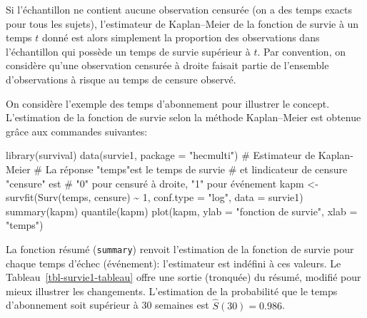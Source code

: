 \documentclass[
  11pt,
  letterpaper,
]{scrbook}
\newenvironment{Shaded}{\begin{snugshade}}{\end{snugshade}}
\newcommand{\AttributeTok}[1]{\textcolor[rgb]{0.40,0.45,0.13}{#1}}
\newcommand{\CommentTok}[1]{\textcolor[rgb]{0.37,0.37,0.37}{#1}}
\newcommand{\DecValTok}[1]{\textcolor[rgb]{0.68,0.00,0.00}{#1}}
\newcommand{\FunctionTok}[1]{\textcolor[rgb]{0.28,0.35,0.67}{#1}}
\newcommand{\NormalTok}[1]{\textcolor[rgb]{0.00,0.23,0.31}{#1}}
\newcommand{\OtherTok}[1]{\textcolor[rgb]{0.00,0.23,0.31}{#1}}
\newcommand{\SpecialCharTok}[1]{\textcolor[rgb]{0.37,0.37,0.37}{#1}}
\newcommand{\StringTok}[1]{\textcolor[rgb]{0.13,0.47,0.30}{#1}}
\theoremstyle{definition}
\theoremstyle{remark}
\begin{document}
Si l'échantillon ne contient aucune observation censurée (on a des temps
exacts pour tous les sujets), l'estimateur de Kaplan--Meier de la
fonction de survie à un temps \(t\) donné est alors simplement la
proportion des observations dans l'échantillon qui possède un temps de
survie supérieur à \(t\). Par convention, on considère qu'une
observation censurée à droite faisait partie de l'ensemble
d'observations à risque au temps de censure observé.

On considère l'exemple des temps d'abonnement pour illustrer le concept.
L'estimation de la fonction de survie selon la méthode Kaplan--Meier est
obtenue grâce aux commandes suivantes:

\begin{Shaded}
\begin{Highlighting}[]
\FunctionTok{library}\NormalTok{(survival)}
\FunctionTok{data}\NormalTok{(survie1, }\AttributeTok{package =} \StringTok{"hecmulti"}\NormalTok{)}
\CommentTok{\# Estimateur de Kaplan{-}Meier}
\CommentTok{\# La réponse "temps"est le temps de survie }
\CommentTok{\# et l\textquotesingle{}indicateur de censure "censure" est}
\CommentTok{\# "0" pour censuré à droite, "1" pour événement}
\NormalTok{kapm }\OtherTok{\textless{}{-}} 
  \FunctionTok{survfit}\NormalTok{(}\FunctionTok{Surv}\NormalTok{(temps, censure) }\SpecialCharTok{\textasciitilde{}} \DecValTok{1}\NormalTok{, }
          \AttributeTok{conf.type =} \StringTok{"log"}\NormalTok{, }
          \AttributeTok{data =}\NormalTok{ survie1)}
\FunctionTok{summary}\NormalTok{(kapm)}
\FunctionTok{quantile}\NormalTok{(kapm)}
\FunctionTok{plot}\NormalTok{(kapm, }
     \AttributeTok{ylab =} \StringTok{"fonction de survie"}\NormalTok{, }
     \AttributeTok{xlab =} \StringTok{"temps"}\NormalTok{) }
\end{Highlighting}
\end{Shaded}

La fonction résumé (\texttt{summary}) renvoit l'estimation de la
fonction de survie pour chaque temps d'échec (événement): l'estimateur
est indéfini à ces valeurs. Le Tableau~\ref{tbl-survie1-tableau} offre
une sortie (tronquée) du résumé, modifié pour mieux illustrer les
changements. L'estimation de la probabilité que le temps d'abonnement
soit supérieur à 30 semaines est \(\widehat{S}(30)=0.986\).
\end{document}
